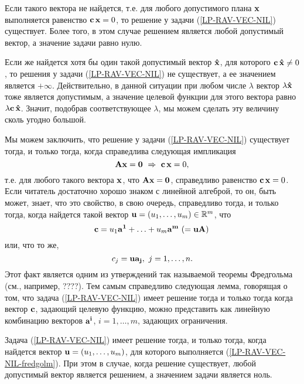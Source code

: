 Если такого вектора не найдется, т.е. для любого допустимого плана
$\mathbf{x}$  выполняется равенство $\mathbf{c} \, \mathbf{x}=0$, то решение у
задачи (\ref{LP-RAV-VEC-NIL}) существует. Более того, в этом случае
решением является любой допустимый вектор, а значение задачи равно
нулю.

Если же найдется хотя бы один такой допустимый вектор
$\mathbf{\hat{x}}$, для которого $\mathbf{c} \,\mathbf{\hat{x}}\neq0$, то
решения у задачи (\ref{LP-RAV-VEC-NIL}) не существует, а ее
значением является $+\infty$. Действительно, в данной ситуации при
любом числе $\lambda$ вектор $\lambda\mathbf{\hat{x}}$ тоже является
допустимым, а значение целевой функции для этого вектора равно
$\lambda\mathbf{c} \,\mathbf{\hat{x}}$. Значит, подобрав соответствующее
$\lambda$, мы можем сделать эту величину сколь угодно большой.

Мы можем заключить, что решение у задачи (\ref{LP-RAV-VEC-NIL})
существует тогда, и только тогда, когда справедлива следующая
импликация
\begin{equation}
    \label{LP-RAV-VEC-NIL-usl0}
    \mathbf{A} \mathbf{x} = \mathbf{0}\ \Rightarrow\ \mathbf{c} \, \mathbf{x}=0,
\end{equation}
т.е. для любого такого вектора $\mathbf{x}$, что $\mathbf{A} \mathbf{x} =
\mathbf{0}$, справедливо равенство $\mathbf{c} \, \mathbf{x}=0$.
    Если читатель достаточно хорошо знаком с линейной алгеброй, то
    он, быть может, знает, что это свойство, в свою очередь,
    справедливо тогда, и только тогда, когда найдется такой вектор
    $\mathbf{u}=(u_{1},\ldots,u_{m})\in\mathbb{R}^{m}$, что
\begin{equation}
    \label{LP-RAV-VEC-NIL-fredgolm}
    \vc{c}=u_{1}\vc{a^{1}}+\ldots+u_{m}\vc{a^{m}} \ (=\vc{u}\vc{A})\,
\end{equation}
    или, что то же,
    \[c_{j}=\mathbf{u}\mathbf{a_{j}}, \ j=1,\ldots,n.\]
        Этот факт является одним из утверждений так называемой
    теоремы Фредгольма (см., например, ????).
    Тем самым справедливо следующая лемма, говорящая о том,
    что задача (\ref{LP-RAV-VEC-NIL}) имеет решение тогда и только
    тогда когда вектор $\mathbf{c}$, задающий целевую функцию,
    можно представить как линейную комбинацию векторов $\mathbf{a^{i}}$,
    $i=1,\ldots,m$, задающих ограничения.
\begin{lem}
    \label{fredgolm}
    Задача (\ref{LP-RAV-VEC-NIL}) имеет решение тогда, и только
    тогда, когда найдется вектор
    $\mathbf{u}=(u_{1},\ldots,u_{m})$, для которого выполняется
    (\ref{LP-RAV-VEC-NIL-fredgolm}). При этом в случае, когда решение
    существует, любой допустимый вектор является решением, а
    значением задачи является ноль.
\end{lem}

